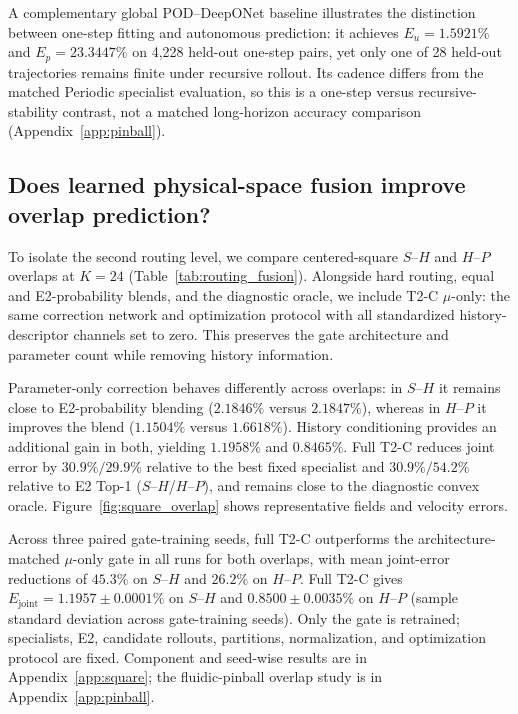 \noindent A complementary global POD--DeepONet baseline illustrates the
distinction between one-step fitting and autonomous prediction: it achieves
$E_u=1.5921\%$ and $E_p=23.3447\%$ on 4,228 held-out one-step pairs, yet
only one of 28 held-out trajectories remains finite under recursive rollout.
Its cadence differs from the matched Periodic specialist evaluation, so this
is a one-step versus recursive-stability contrast, not a matched long-horizon
accuracy comparison (Appendix~\ref{app:pinball}).

\subsection{Does learned physical-space fusion improve overlap prediction?}

To isolate the second routing level, we compare centered-square $S$--$H$ and
$H$--$P$ overlaps at $K=24$ (Table~\ref{tab:routing_fusion}). Alongside hard
routing, equal and E2-probability blends, and the diagnostic oracle, we include
T2-C $\mu$-only: the same correction network and optimization protocol with all
standardized history-descriptor channels set to zero. This preserves the gate
architecture and parameter count while removing history information.

Parameter-only correction behaves differently across overlaps: in $S$--$H$ it
remains close to E2-probability blending ($2.1846\%$ versus $2.1847\%$), whereas
in $H$--$P$ it improves the blend ($1.1504\%$ versus $1.6618\%$).
History conditioning provides an additional gain in both, yielding
$1.1958\%$ and $0.8465\%$. Full T2-C reduces joint error by $30.9\%/29.9\%$
relative to the best fixed specialist and $30.9\%/54.2\%$ relative to E2 Top-1
($S$--$H$/$H$--$P$), and remains close to the diagnostic convex oracle.
Figure~\ref{fig:square_overlap} shows representative fields and velocity errors.

Across three paired gate-training seeds, full T2-C outperforms the
architecture-matched $\mu$-only gate in all runs for both overlaps, with mean
joint-error reductions of $45.3\%$ on $S$--$H$ and $26.2\%$ on $H$--$P$.
Full T2-C gives
$E_{\mathrm{joint}}=1.1957\pm0.0001\%$ on $S$--$H$ and
$0.8500\pm0.0035\%$ on $H$--$P$ (sample standard deviation across gate-training seeds).
Only the gate is retrained; specialists, E2, candidate rollouts, partitions,
normalization, and optimization protocol are fixed. Component and seed-wise
results are in Appendix~\ref{app:square}; the fluidic-pinball overlap study is
in Appendix~\ref{app:pinball}.

